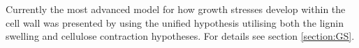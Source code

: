 Currently the most advanced model for how growth stresses develop within the
cell wall was presented by \citet{Alm_ras_2005} using the unified hypothesis
\citep{okuyama1986,Okuyama_1994,yamamoto1991,ISI:A1992HP18200001,Yamamoto_1998} utilising both the lignin swelling and
cellulose contraction hypotheses. For details see section \ref{section:GS}.